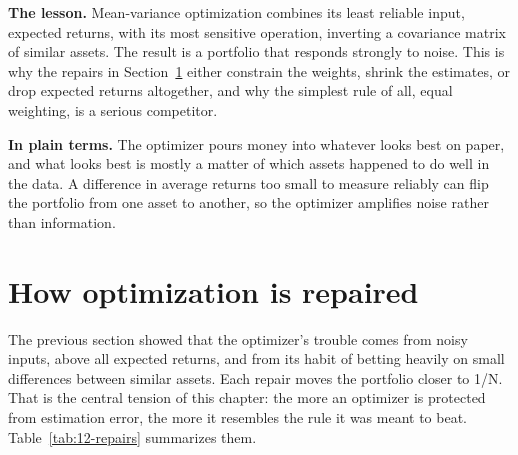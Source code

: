 \textbf{The lesson.} Mean-variance optimization combines its least reliable input, expected returns, with its most sensitive operation, inverting a covariance matrix of similar assets. The result is a portfolio that responds strongly to noise. This is why the repairs in Section~\ref{sec:12-repairs} either constrain the weights, shrink the estimates, or drop expected returns altogether, and why the simplest rule of all, equal weighting, is a serious competitor.

\noindent\textbf{In plain terms.} The optimizer pours money into whatever looks best on paper, and what looks best is mostly a matter of which assets happened to do well in the data. A difference in average returns too small to measure reliably can flip the portfolio from one asset to another, so the optimizer amplifies noise rather than information.


\section{How optimization is repaired}
\label{sec:12-repairs}

The previous section showed that the optimizer's trouble comes from noisy inputs, above all expected returns, and from its habit of betting heavily on small differences between similar assets.
Each repair moves the portfolio closer to 1/N. That is the central tension of this chapter: the more an optimizer is protected from estimation error, the more it resembles the rule it was meant to beat.
Table~\ref{tab:12-repairs} summarizes them.



